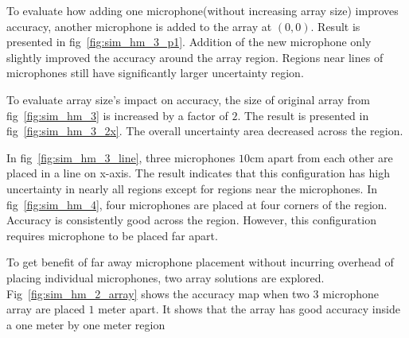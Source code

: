 To evaluate how adding one microphone(without increasing array size) improves accuracy,  another microphone is added to the array at $(0,0)$. Result is presented in fig~\ref{fig:sim_hm_3_p1}. Addition of the new microphone only slightly improved the accuracy around the array region. Regions near lines of microphones still have significantly larger uncertainty region.

To evaluate array size's impact on accuracy, the size of original array from fig~\ref{fig:sim_hm_3} is increased by a factor of $2$. The result is presented in fig~\ref{fig:sim_hm_3_2x}. The overall uncertainty area decreased across the region. 

In fig~\ref{fig:sim_hm_3_line}, three microphones $10$cm apart from each other are placed in a line on x-axis. The result indicates that this configuration has high uncertainty in nearly all regions except for regions near the microphones. In fig~\ref{fig:sim_hm_4}, four microphones are placed at four corners of the region. Accuracy is consistently good across the region. However, this configuration requires microphone to be placed far apart.

To get benefit of far away microphone placement without incurring overhead of placing individual microphones, two array solutions are explored. Fig~\ref{fig:sim_hm_2_array} shows the accuracy map when two $3$ microphone array are placed $1$ meter apart.  It shows that the array has good accuracy inside a one meter by one meter region
